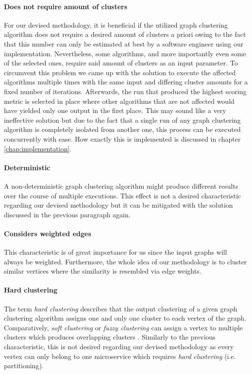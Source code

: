 \documentclass[12pt,a4paper]{report}
\begin{document}
\paragraph{Does not require amount of clusters}
For our devised methodology, it is beneficial if the utilized graph clustering
algorithm does not require a desired amount of clusters a priori owing to
the fact that this number can only be estimated at best by a software engineer
using our implementation.
Nevertheless, some algorithms, and more importantly even some of the selected ones,
require said amount of clusters as an input parameter.
To circumvent this problem we came up with the solution to execute the affected
algorithms multiple times with the same input and differing cluster amounts
for a fixed number of iterations. Afterwards, the run that produced the highest
scoring metric is selected in place where other algorithms that are not affected
would have yielded only one output in the first place.
This may sound like a very ineffective solution but due to the fact that
a single run of any graph clustering algorithm is completely isolated from
another one, this process can be executed concurrently with ease.
How exactly this is implemented is discussed in chapter \ref{chap:implementation}.

\paragraph{Deterministic}
A non\hyp deterministic graph clustering algorithm might produce different
results over the course of multiple executions. This effect is not a desired
characteristic regarding our devised methodology but it can be mitigated
with the solution discussed in the previous paragraph again.

\paragraph{Considers weighted edges}
This characteristic is of great importance for us since the input graphs
will always be weighted. Furthermore, the whole idea of our methodology
is to cluster similar vertices where the similarity is resembled via edge weights.

\paragraph{Hard clustering}
The term \textit{hard clustering} describes that the output clustering
of a given graph clustering algorithm assigns one and only one cluster
to each vertex of the graph. Comparatively, \textit{soft clustering} or
\textit{fuzzy clustering} can assign a vertex to multiple clusters which
produces overlapping clusters \cite{lancichinetti2009community}.
Similarly to the previous characteristic, this is not desired regarding our
devised methodology as every vertex can only belong to one microservice
which requires \textit{hard clustering} (i.e. partitioning).
\end{document}
